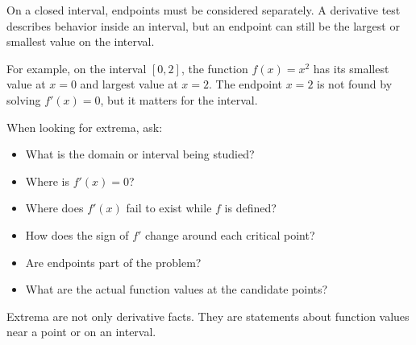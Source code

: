 On a closed interval, endpoints must be considered separately. A derivative test describes behavior inside an interval, but an endpoint can still be the largest or smallest value on the interval.

For example, on the interval \([0,2]\), the function \(f(x)=x^2\) has its smallest value at \(x=0\) and largest value at \(x=2\). The endpoint \(x=2\) is not found by solving \(f'(x)=0\), but it matters for the interval.

\begin{summarybox}
When looking for extrema, ask:
\begin{itemize}
\item What is the domain or interval being studied?
\item Where is \(f'(x)=0\)?
\item Where does \(f'(x)\) fail to exist while \(f\) is defined?
\item How does the sign of \(f'\) change around each critical point?
\item Are endpoints part of the problem?
\item What are the actual function values at the candidate points?
\end{itemize}
\end{summarybox}

Extrema are not only derivative facts. They are statements about function values near a point or on an interval.